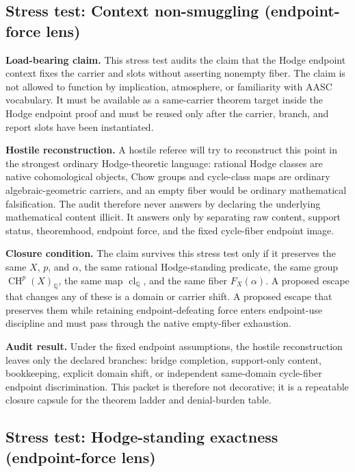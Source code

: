 \documentclass[11pt]{article}
\newcommand{\QQ}{\mathbb{Q}}
\newcommand{\CH}{\operatorname{CH}}
\newcommand{\clQ}{\operatorname{cl}_{\QQ}}
\begin{document}
\subsection{Stress test: Context non-smuggling (endpoint-force lens)}

\par\noindent\textbf{Load-bearing claim.} This stress test audits the claim that the Hodge endpoint context fixes the carrier and slots without asserting nonempty fiber. The claim is not allowed to function by implication, atmosphere, or familiarity with AASC vocabulary. It must be available as a same-carrier theorem target inside the Hodge endpoint proof and must be reused only after the carrier, branch, and report slots have been instantiated.

\par\noindent\textbf{Hostile reconstruction.} A hostile referee will try to reconstruct this point in the strongest ordinary Hodge-theoretic language: rational Hodge classes are native cohomological objects, Chow groups and cycle-class maps are ordinary algebraic-geometric carriers, and an empty fiber would be ordinary mathematical falsification. The audit therefore never answers by declaring the underlying mathematical content illicit. It answers only by separating raw content, support status, theoremhood, endpoint force, and the fixed cycle-fiber endpoint image.

\par\noindent\textbf{Closure condition.} The claim survives this stress test only if it preserves the same $X$, $p$, and $\alpha$, the same rational Hodge-standing predicate, the same group $\CH^p(X)_\QQ$, the same map $\clQ$, and the same fiber $F_X(\alpha)$. A proposed escape that changes any of these is a domain or carrier shift. A proposed escape that preserves them while retaining endpoint-defeating force enters endpoint-use discipline and must pass through the native empty-fiber exhaustion.

\par\noindent\textbf{Audit result.} Under the fixed endpoint assumptions, the hostile reconstruction leaves only the declared branches: bridge completion, support-only content, bookkeeping, explicit domain shift, or independent same-domain cycle-fiber endpoint discrimination. This packet is therefore not decorative; it is a repeatable closure capsule for the theorem ladder and denial-burden table.


\subsection{Stress test: Hodge-standing exactness (endpoint-force lens)}
\end{document}

